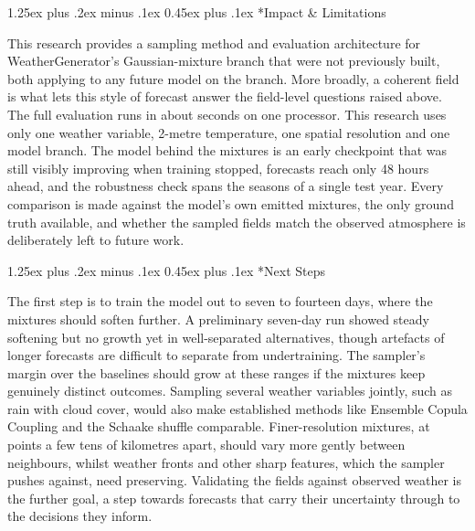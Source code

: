 \documentclass[10pt,letterpaper,twocolumn]{article}
\makeatletter
\renewcommand\section{\@startsection {section}{1}{\z@}%
  {1.25ex plus .2ex minus .1ex}%
  {0.45ex plus .1ex}%
  {\normalfont\normalsize\bfseries}}
\makeatother
\begin{document}
\section*{Impact \& Limitations}

This research provides a sampling method and evaluation architecture for
WeatherGenerator's Gaussian-mixture branch that were not previously built, both
applying to any future model on the branch. More broadly, a coherent field is what
lets this style of forecast answer the field-level questions raised above. The full
evaluation runs in about \computeAuditWallSeconds{} seconds on one processor.
This research uses only one weather variable, 2-metre temperature, one spatial
resolution and one model branch. The model
behind the mixtures is an early checkpoint that was still visibly improving when
training stopped, forecasts reach only 48 hours ahead, and the robustness check spans
the seasons of a single test year. Every comparison is made against the model's own
emitted mixtures, the only ground truth available, and whether the sampled fields match
the observed atmosphere is deliberately left to future work.

\section*{Next Steps}

The first step is to train the model out to seven to fourteen days, where the mixtures
should soften further. A preliminary seven-day run showed steady
softening but no growth yet in well-separated alternatives, though artefacts of longer forecasts are
difficult to separate from undertraining. The sampler's margin over the baselines
should grow at these ranges if the mixtures keep genuinely distinct outcomes. Sampling several
weather variables jointly, such as rain with cloud cover, would also make established
methods like Ensemble Copula Coupling \cite{schefzik2013ecc} and the Schaake shuffle
\cite{clark2004schaake} comparable.
Finer-resolution mixtures, at points a few tens of kilometres apart, should
vary more gently between neighbours, whilst weather fronts and other sharp features,
which the sampler pushes against, need preserving. Validating the fields against
observed weather is the further goal, a step towards forecasts that carry their
uncertainty through to the decisions they inform.



\end{document}
